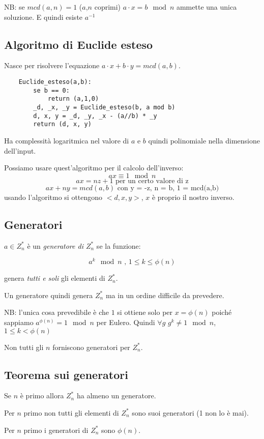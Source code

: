 NB: se $mcd(a,n)=1$ ($a$,$n$ coprimi) $a \cdot x = b \mod n$ ammette una unica soluzione. E quindi esiste $a^{-1}$


\subsection{Algoritmo di Euclide esteso}
Nasce per risolvere l'equazione $a \cdot x + b \cdot y = mcd(a,b)$.
\begin{verbatim}
    Euclide_esteso(a,b):
        se b == 0:
            return (a,1,0)
        _d, _x, _y = Euclide_esteso(b, a mod b)
        d, x, y = _d, _y, _x - (a//b) * _y
        return (d, x, y)
\end{verbatim}
Ha complessità logaritmica nel valore di $a$ e $b$ quindi polinomiale nella dimensione dell'input.

Possiamo usare quest'algoritmo per il calcolo dell'inverso:
$$ ax \equiv 1 \mod n $$
$$ ax = nz + 1 \text{ per un certo valore di z} $$
$$ ax + ny = mcd(a,b) \text{ con y = -z, n = b, 1 = mcd(a,b)} $$
usando l'algoritmo si ottengono $<d, x, y>$, $x$ è proprio il nostro inverso.

\subsection{Generatori}
$a \in Z_{n}^*$ è un \emph{generatore di $Z_{n}^*$} se la funzione:

$$ a^k \mod n \text{ , } 1 \leq k \leq \phi(n) $$

genera \emph{tutti e soli} gli elementi di $Z_{n}^*$.

Un generatore quindi genera $Z_{n}^*$ ma in un ordine difficile da prevedere.

NB: l'unica cosa prevedibile è che $1$ si ottiene solo per $x = \phi(n)$ poiché sappiamo $a^{\phi(n)} = 1 \mod n$ per Eulero. Quindi $\forall g$ $g^k \neq 1 \mod n$, $ 1 \leq k < \phi(n)$

Non tutti gli $n$ forniscono generatori per $Z_{n}^*$.

\subsection{Teorema sui generatori}
Se $n$ è primo allora $Z_{n}^*$ ha almeno un generatore.

Per $n$ primo non tutti gli elementi di $Z_n^*$ sono suoi generatori (1 non lo è mai).

Per $n$ primo i generatori di $Z_n^*$ sono $\phi(n)$.

